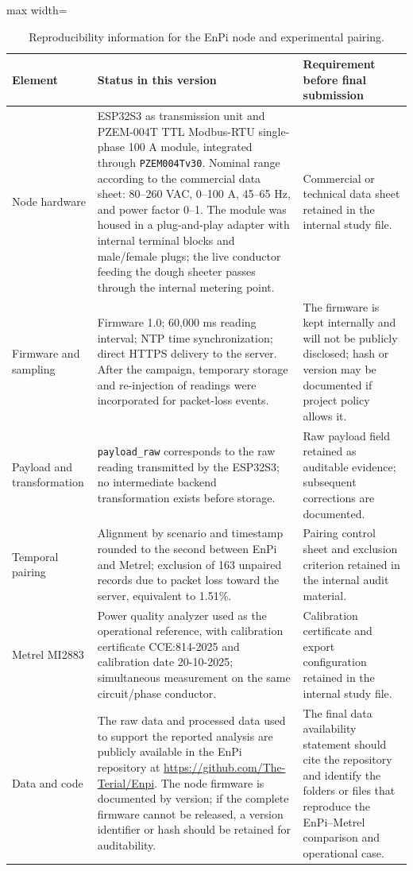 \documentclass{ieeeaccess}
\begin{document}
\begin{table}[t]
\caption{Reproducibility information for the EnPi node and experimental pairing.}
\label{tab:reproducibilidad-minima}
\centering
\scriptsize
\begin{adjustbox}{max width=\textwidth}
\begin{tabular}{p{}p{}p{}}
\toprule
Element & Status in this version & Requirement before final submission \\
\midrule
Node hardware & ESP32S3 as transmission unit and PZEM-004T TTL Modbus-RTU single-phase 100 A module, integrated through \texttt{PZEM004Tv30}. Nominal range according to the commercial data sheet: 80--260 VAC, 0--100 A, 45--65 Hz, and power factor 0--1. The module was housed in a plug-and-play adapter with internal terminal blocks and male/female plugs; the live conductor feeding the dough sheeter passes through the internal metering point. & Commercial or technical data sheet retained in the internal study file. \\
Firmware and sampling & Firmware 1.0; 60,000 ms reading interval; NTP time synchronization; direct HTTPS delivery to the server. After the campaign, temporary storage and re-injection of readings were incorporated for packet-loss events. & The firmware is kept internally and will not be publicly disclosed; hash or version may be documented if project policy allows it. \\
Payload and transformation & \texttt{payload\_raw} corresponds to the raw reading transmitted by the ESP32S3; no intermediate backend transformation exists before storage. & Raw payload field retained as auditable evidence; subsequent corrections are documented. \\
Temporal pairing & Alignment by scenario and timestamp rounded to the second between EnPi and Metrel; exclusion of 163 unpaired records due to packet loss toward the server, equivalent to 1.51\%. & Pairing control sheet and exclusion criterion retained in the internal audit material. \\
Metrel MI2883 & Power quality analyzer used as the operational reference, with calibration certificate CCE:814-2025 and calibration date 20-10-2025; simultaneous measurement on the same circuit/phase conductor. & Calibration certificate and export configuration retained in the internal study file. \\
Data and code & The raw data and processed data used to support the reported analysis are publicly available in the EnPi repository at \url{https://github.com/The-Terial/Enpi}. The node firmware is documented by version; if the complete firmware cannot be released, a version identifier or hash should be retained for auditability. & The final data availability statement should cite the repository and identify the folders or files that reproduce the EnPi--Metrel comparison and operational case. \\
\bottomrule
\end{tabular}
\end{adjustbox}
\end{table}
\end{document}

